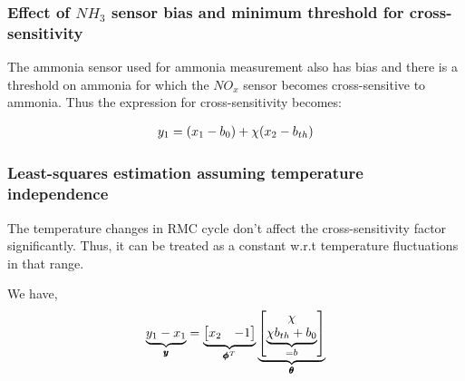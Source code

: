 
\subsubsection{Effect of $NH_3$ sensor bias and minimum threshold for cross-sensitivity}
The ammonia sensor used for ammonia measurement also has bias and there is a
threshold on ammonia for which the $NO_x$ sensor becomes cross-sensitive to
ammonia. Thus the expression for cross-sensitivity becomes:

\begin{align*}
    y_1 &= \left( x_1 - b_0 \right) + \chi (x_2 - b_{th})\\
\end{align*}

\subsubsection{Least-squares estimation assuming temperature independence}
The temperature changes in RMC cycle don't affect the
cross-sensitivity factor significantly. Thus, it can be treated as a constant
w.r.t temperature fluctuations in that range.

We have,
\begin{align*}
    \underbrace{y_1 - x_1}_{\pmb y} &= \underbrace{\begin{bmatrix} x_2 & -1 \end{bmatrix}}_{\pmb \phi^T} \underbrace{\begin{bmatrix}  \chi \\ \underbrace{\chi b_{th} + b_0}_{=b} \end{bmatrix}}_{ \pmb \theta}\\
\end{align*}

